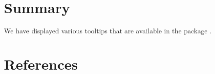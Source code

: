\hypertarget{summary}{%
\section{Summary}\label{summary}}

We have displayed various tooltips that are available in the package .

\hypertarget{references}{%
\section{References}\label{references}}



\address{%
Yuqian wang\\
Calvin University\\%
Department of Letter Q\\ Somewhere, Australia\\
%
\url{https://www.britannica.com/animal/quokka}\\%
\textit{ORCiD: \href{https://orcid.org/0000-1721-1511-1101}{0000-1721-1511-1101}}\\%
\href{mailto:qquo@ulm.edu}{\nolinkurl{qquo@ulm.edu}}%
}

\address{%
Oghenesuvwe Ogedegbe\\
Calvin University\\%
Department of Letter Q, Somewhere, Australia\\ Department of Marsupials, Somewhere, Australia\\
%
\url{https://www.britannica.com/animal/bilby}\\%
\textit{ORCiD: \href{https://orcid.org/0000-0002-0912-0225}{0000-0002-0912-0225}}\\%
\href{mailto:bbil@ulm.edu}{\nolinkurl{bbil@ulm.edu}}%
}

